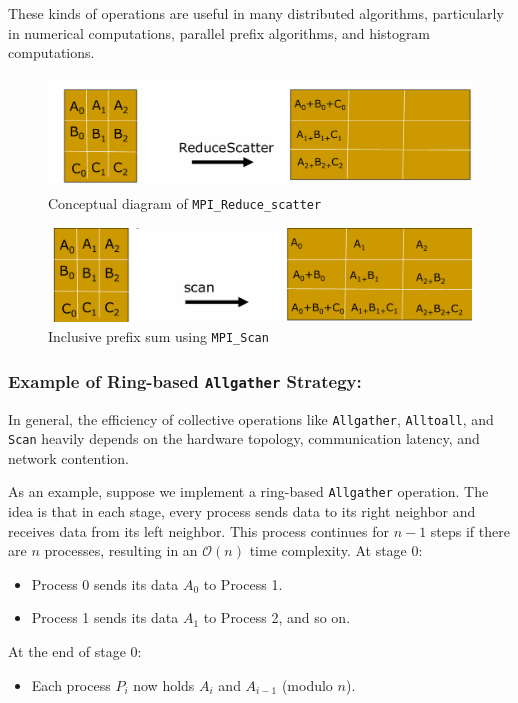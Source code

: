 \documentclass[12pt]{book}
\begin{document}
These kinds of operations are useful in many distributed algorithms, particularly in numerical computations, parallel prefix algorithms, and histogram computations.

\begin{figure}[H]
    \centering
    \includegraphics[width=0.75\linewidth]{images/reducescatter.png}
    \caption{Conceptual diagram of \texttt{MPI\_Reduce\_scatter}}
    \label{fig:reducescatter}
\end{figure}

\begin{figure}[H]
    \centering
    \includegraphics[width=0.75\linewidth]{images/scan.png}
    \caption{Inclusive prefix sum using \texttt{MPI\_Scan}}
    \label{fig:scan}
\end{figure}

\subsubsection{Example of Ring-based \texttt{Allgather} Strategy:}
In general, the efficiency of collective operations like \texttt{Allgather}, \texttt{Alltoall}, and \texttt{Scan} heavily depends on the hardware topology, communication latency, and network contention.

As an example, suppose we implement a ring-based \texttt{Allgather} operation. The idea is that in each stage, every process sends data to its right neighbor and receives data from its left neighbor. This process continues for $n - 1$ steps if there are $n$ processes, resulting in an $\mathcal{O}(n)$ time complexity.
At stage 0:
\begin{itemize}
    \item Process 0 sends its data $A_0$ to Process 1.
    \item Process 1 sends its data $A_1$ to Process 2, and so on.
\end{itemize}

At the end of stage 0:
\begin{itemize}
    \item Each process $P_i$ now holds $A_i$ and $A_{i-1}$ (modulo $n$).
\end{itemize}
\end{document}
